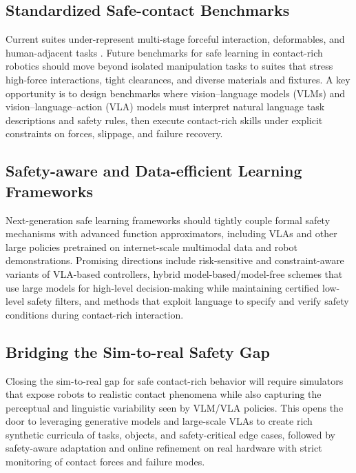 \documentclass[Afour,sageh,times]{template/sagej}
\begin{document}
    \subsection{Standardized Safe-contact Benchmarks}
    Current suites under-represent multi-stage forceful interaction, deformables, and human-adjacent
    tasks \citep{towers2024gymnasium,geng2025roboverse,gu2025robust,yuan2022safe}. Future benchmarks for safe learning in contact-rich robotics should move beyond isolated manipulation tasks to suites that stress high-force interactions, tight clearances, and diverse materials and fixtures. A key opportunity is to design benchmarks where vision–language models (VLMs) and vision–language–action (VLA) models must interpret natural language task descriptions and safety rules, then execute contact-rich skills under explicit constraints on forces, slippage, and failure recovery.
    
    \subsection{Safety-aware and Data-efficient Learning Frameworks}
    Next-generation safe learning frameworks should tightly couple formal safety mechanisms with advanced function approximators, including VLAs and other large policies pretrained on internet-scale multimodal data and robot demonstrations. Promising directions include risk-sensitive and constraint-aware variants of VLA-based controllers, hybrid model-based/model-free schemes that use large models for high-level decision-making while maintaining certified low-level safety filters, and methods that exploit language to specify and verify safety conditions during contact-rich interaction.
    
    \subsection{Bridging the Sim-to-real Safety Gap}
    Closing the sim-to-real gap for safe contact-rich behavior will require simulators that expose robots to realistic contact phenomena while also capturing the perceptual and linguistic variability seen by VLM/VLA policies. This opens the door to leveraging generative models and large-scale VLAs to create rich synthetic curricula of tasks, objects, and safety-critical edge cases, followed by safety-aware adaptation and online refinement on real hardware with strict monitoring of contact forces and failure modes.
    
\end{document}
